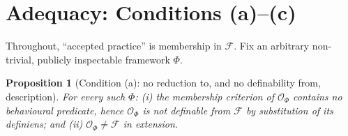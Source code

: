 \documentclass{amsart}
\theoremstyle{definition}
\theoremstyle{plain}
\newtheorem{proposition}{Proposition}
\theoremstyle{remark}
\begin{document}
\section{Adequacy: Conditions (a)--(c)}

Throughout, ``accepted practice'' is membership in $\mathcal{F}$. Fix an
arbitrary non-trivial, publicly inspectable framework $\Phi$.

\begin{proposition}[Condition (a): no reduction to, and no definability from,
description]\label{prop:a}
For every such $\Phi$: \emph{(i)} the membership criterion of
$\mathcal{O}_\Phi$ contains no behavioural predicate, hence $\mathcal{O}_\Phi$
is not definable from $\mathcal{F}$ by substitution of its definiens; and
\emph{(ii)} $\mathcal{O}_\Phi\neq\mathcal{F}$ in extension.
\end{proposition}
\end{document}
